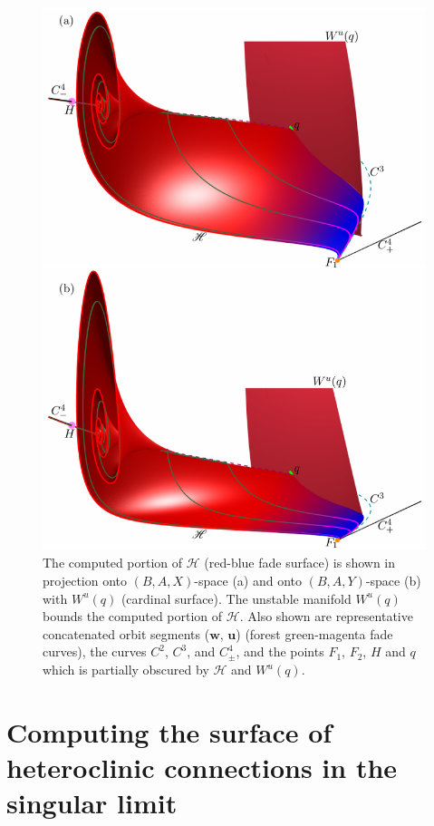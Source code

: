 \documentclass{ws-ijbc}
\begin{document}
\begin{figure}[H]
\centering
\includegraphics[]{./figures/MKMO_12.pdf}
\caption{The computed portion of $\mathscr{H}$ (red-blue fade surface) is shown in projection onto $(B,A,X)$-space (a) and onto $(B,A,Y)$-space (b) with $W^u(q)$ (cardinal surface).  The unstable manifold $W^u(q)$ bounds the computed portion of $\mathscr{H}$.  Also shown are representative concatenated orbit segments ($\mathbf{w}$, $\mathbf{u}$) (forest green-magenta fade curves), the curves $C^2$, $C^3$, and $C^4_\pm$, and the points $F_1$, $F_2$, $H$ and $q$ which is partially obscured by $\mathscr{H}$ and $W^u(q)$.}
\label{figure_12}
\end{figure}
\section{Computing the surface of heteroclinic connections in the singular limit}
\end{document}
